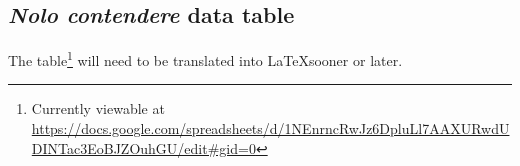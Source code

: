 \newpage
\subsection{\textit{Nolo contendere} data table}

The table\footnote{Currently viewable at \url{https://docs.google.com/spreadsheets/d/1NEnrncRwJz6DpluLl7AAXURwdUDINTac3EoBJZOuhGU/edit\#gid=0}} will need to be translated into \LaTeX  sooner or later.